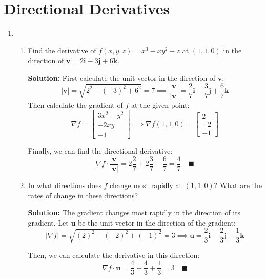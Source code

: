 \documentclass[letterpaper, 11pt]{article}
\begin{document}
\section{Directional Derivatives}
\begin{enumerate}
\item \begin{enumerate}[label = (\alph*)]
\item Find the derivative of $f(x,y,z) = x^3 - xy^2 - z$ at $(1,1,0)$ in the direction of $\bm{v} = 2 \bm{i} -3 \bm{j} + 6 \bm{k}$.
\par \textbf{Solution:} First calculate the unit vector in the direction of $\bm{v}$:
\[ | \bm{v}| = \sqrt{ 2^2 + (-3)^2 + 6^2} = 7 \implies \frac{ \bm{v}}{|\bm{v}|} = \frac{2}{7} \bm{i} - \frac{3}{7} \bm{j} + \frac{6}{7} \bm{k} \]
Then calculate the gradient of $f$ at the given point:
\[ \nabla f = \left[ \begin{array}{c} 3x^2 - y^2 \\ -2xy \\ -1 \end{array} \right] \implies 
\nabla f(1,1,0) = \left[ \begin{array}{c} 2 \\ -2 \\ -1 \end{array} \right] \]

Finally, we can find the directional derivative:
\[ \nabla f \cdot \frac{ \bm{v}}{|\bm{v}|} = 2 \frac{2}{7}+ 2 \frac{3}{7} - \frac{ 6}{7} = \frac{4}{7 } \quad\blacksquare \]

\item In what directions does $f$ change most rapidly at $(1,1,0)$? What are the rates of change in these directions?
\par \textbf{Solution:} The gradient changes most rapidly in the direction of its gradient. Let $\bm{u}$ be the unit vector in the direction of the gradient:
\[ |\nabla f | = \sqrt{ (2)^2 + (-2)^2 + (-1)^2 } = 3 \implies \bm{u} = \frac{2}{3} \bm{i} - \frac{2}{3} \bm{j} + \frac{1}{3} \bm{k}  \]

Then, we can calculate the derivative in this direction:
\[ \nabla f \cdot \bm{u} = \frac{4}{3} + \frac{ 4}{3} + \frac{1}{3} = 3 \quad\blacksquare \]

\end{enumerate}



\end{enumerate}
\end{document}
